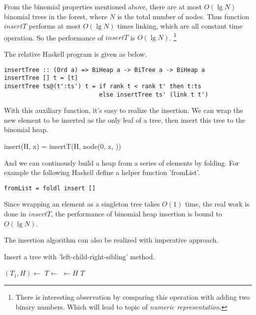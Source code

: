 \documentclass{article}
\begin{document}
From the binomial properties mentioned above, there are at most
$O(\lg N)$ binomial trees in the forest, where $N$ is the total
number of nodes. Thus function $insertT$ performs at most $O(\lg N)$
times linking, which are all constant time operation. So the
performance of $insertT$ is $O(\lg N)$. 
\footnote{There is interesting observation by comparing this 
operation with adding two binary numbers. Which will lead to
topic of {\em numeric representation}\cite{okasaki-book}.}

The relative Haskell program is given as below.

\lstset{language=Haskell}
\begin{lstlisting}
insertTree :: (Ord a) => BiHeap a -> BiTree a -> BiHeap a
insertTree [] t = [t]
insertTree ts@(t':ts') t = if rank t < rank t' then t:ts
                           else insertTree ts' (link t t')
\end{lstlisting}

With this auxiliary function, it's easy to realize the insertion.
We can wrap the new element to be inserted as the only leaf of a tree,
then insert this tree to the binomial heap.

\be
insert(H, x) = insertT(H, node(0, x, \phi))
\ee

And we can continously build a heap from a series of elements by folding.
For example the following Haskell define a helper function 'fromList'.

\begin{lstlisting}
fromList = foldl insert []
\end{lstlisting}

Since wrapping an element as a singleton tree takes $O(1)$ time, 
the real work is done in $insertT$, the performance of binomial
heap insertion is bound to $O(\lg N)$.

The insertion algorithm can also be realized with imperative approach.

\begin{algorithm}
\caption{Insert a tree with 'left-child-right-sibling' method.}
\label{alg:insert-tree}
\begin{algorithmic}[1]
    \State $(T_1, H) \gets$ 
    \State $T \gets $ 
  \EndWhile
  \State {} $\gets H$
  \State \Return $T$
\EndFunction
\end{algorithmic}
\end{algorithm}
\end{document}
